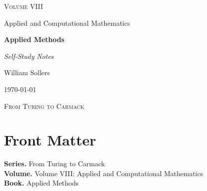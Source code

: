 \documentclass[12pt, a4paper]{report}
\begin{document}
\ExplSyntaxOff
\renewcommand{\familydefault}{\rmdefault}

\begin{titlepage}
\centering
\vspace*{3.5cm}

{\Large\scshape Volume VIII\par}
\vspace{0.35cm}
{\large Applied and Computational Mathematics\par}

\vspace{1.4cm}

{\Huge\bfseries Applied Methods\par}

\vspace{0.6cm}
{\large\itshape Self-Study Notes\par}

\vfill

{\large William Sollers\par}
\vspace{0.35cm}
{\large \today\par}

\vfill

{\large\scshape From Turing to Carmack\par}
\end{titlepage}

\clearpage
\thispagestyle{plain}
\chapter*{Front Matter}
\noindent\textbf{Series.} From Turing to Carmack\\[0.5em]
\textbf{Volume.} Volume VIII: Applied and Computational Mathematics\\[0.5em]
\textbf{Book.} Applied Methods

\clearpage
\tableofcontents
\clearpage
{}



\clearpage



\printindex[tech]
\printindex[dep]
\end{document}
